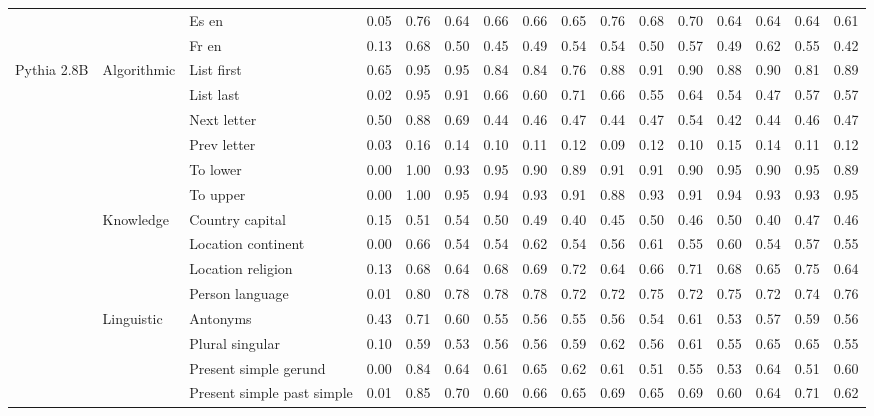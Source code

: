 \begin{center}
\begin{longtable}{lllrrrrrrrrrrrrr}
 &  & Es en & 0.05 & 0.76 & 0.64 & 0.66 & 0.66 & 0.65 & 0.76 & 0.68 & 0.70 & 0.64 & 0.64 & 0.64 & 0.61 \\
 &  & Fr en & 0.13 & 0.68 & 0.50 & 0.45 & 0.49 & 0.54 & 0.54 & 0.50 & 0.57 & 0.49 & 0.62 & 0.55 & 0.42 \\
\cline{1-16} \cline{2-16}
\multirow[t]{18}{*}{Pythia 2.8B} & \multirow[t]{6}{*}{Algorithmic} & List first & 0.65 & 0.95 & 0.95 & 0.84 & 0.84 & 0.76 & 0.88 & 0.91 & 0.90 & 0.88 & 0.90 & 0.81 & 0.89 \\
 &  & List last & 0.02 & 0.95 & 0.91 & 0.66 & 0.60 & 0.71 & 0.66 & 0.55 & 0.64 & 0.54 & 0.47 & 0.57 & 0.57 \\
 &  & Next letter & 0.50 & 0.88 & 0.69 & 0.44 & 0.46 & 0.47 & 0.44 & 0.47 & 0.54 & 0.42 & 0.44 & 0.46 & 0.47 \\
 &  & Prev letter & 0.03 & 0.16 & 0.14 & 0.10 & 0.11 & 0.12 & 0.09 & 0.12 & 0.10 & 0.15 & 0.14 & 0.11 & 0.12 \\
 &  & To lower & 0.00 & 1.00 & 0.93 & 0.95 & 0.90 & 0.89 & 0.91 & 0.91 & 0.90 & 0.95 & 0.90 & 0.95 & 0.89 \\
 &  & To upper & 0.00 & 1.00 & 0.95 & 0.94 & 0.93 & 0.91 & 0.88 & 0.93 & 0.91 & 0.94 & 0.93 & 0.93 & 0.95 \\
\cline{2-16}
 & \multirow[t]{4}{*}{Knowledge} & Country capital & 0.15 & 0.51 & 0.54 & 0.50 & 0.49 & 0.40 & 0.45 & 0.50 & 0.46 & 0.50 & 0.40 & 0.47 & 0.46 \\
 &  & Location continent & 0.00 & 0.66 & 0.54 & 0.54 & 0.62 & 0.54 & 0.56 & 0.61 & 0.55 & 0.60 & 0.54 & 0.57 & 0.55 \\
 &  & Location religion & 0.13 & 0.68 & 0.64 & 0.68 & 0.69 & 0.72 & 0.64 & 0.66 & 0.71 & 0.68 & 0.65 & 0.75 & 0.64 \\
 &  & Person language & 0.01 & 0.80 & 0.78 & 0.78 & 0.78 & 0.72 & 0.72 & 0.75 & 0.72 & 0.75 & 0.72 & 0.74 & 0.76 \\
\cline{2-16}
 & \multirow[t]{4}{*}{Linguistic} & Antonyms & 0.43 & 0.71 & 0.60 & 0.55 & 0.56 & 0.55 & 0.56 & 0.54 & 0.61 & 0.53 & 0.57 & 0.59 & 0.56 \\
 &  & Plural singular & 0.10 & 0.59 & 0.53 & 0.56 & 0.56 & 0.59 & 0.62 & 0.56 & 0.61 & 0.55 & 0.65 & 0.65 & 0.55 \\
 &  & Present simple gerund & 0.00 & 0.84 & 0.64 & 0.61 & 0.65 & 0.62 & 0.61 & 0.51 & 0.55 & 0.53 & 0.64 & 0.51 & 0.60 \\
 &  & Present simple past simple & 0.01 & 0.85 & 0.70 & 0.60 & 0.66 & 0.65 & 0.69 & 0.65 & 0.69 & 0.60 & 0.64 & 0.71 & 0.62 \\

\end{longtable}
\end{center}
